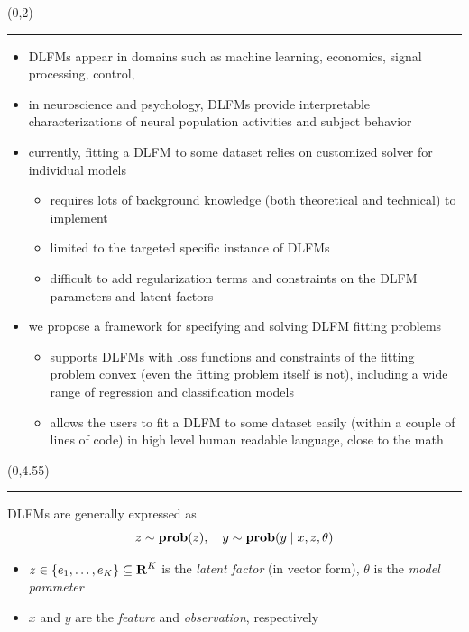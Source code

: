 \documentclass[a0]{a0poster}
\begin{document}
\begin{textblock}{7}(0,2)
    \hrule\vspace*{0.5\baselineskip}
    \begin{itemize}
        \item DLFMs appear in domains such as machine learning, economics, signal processing, control, \etc\
        \item in neuroscience and psychology, DLFMs provide interpretable characterizations of neural population activities and subject behavior
        \item currently, fitting a DLFM to some dataset relies on customized solver for individual models
            \begin{itemize}
                \item requires lots of background knowledge (both theoretical and technical) to implement
                \item limited to the targeted specific instance of DLFMs
                \item difficult to add regularization terms and constraints on the DLFM parameters and latent factors
            \end{itemize}
        \item we propose a framework for specifying and solving DLFM fitting problems
            \begin{itemize}
                \item supports DLFMs with loss functions and constraints of the fitting problem convex (even the fitting problem itself is not), including a wide range of regression and classification models
                \item allows the users to fit a DLFM to some dataset easily (within a couple of lines of code) in high level human readable language, close to the math
            \end{itemize}
    \end{itemize}
\end{textblock}

\begin{textblock}{7}(0,4.55)
    \hrule\vspace*{0.5\baselineskip}

    DLFMs are generally expressed as
    \[
        z \sim \mathop{\bf prob{}}(z),\quad
        y \sim \mathop{\bf prob{}}(y \mid x, z, \theta)
    \]
    \begin{itemize}
        \item $z \in \{e_1, \ldots, e_K\} \subseteq {\bf R{}}^K$ is the \emph{latent factor} (in vector form), $\theta$ is the \emph{model parameter}
        \item $x$ and $y$ are the \emph{feature} and \emph{observation}, respectively
    \end{itemize}
\end{textblock}
\end{document}
